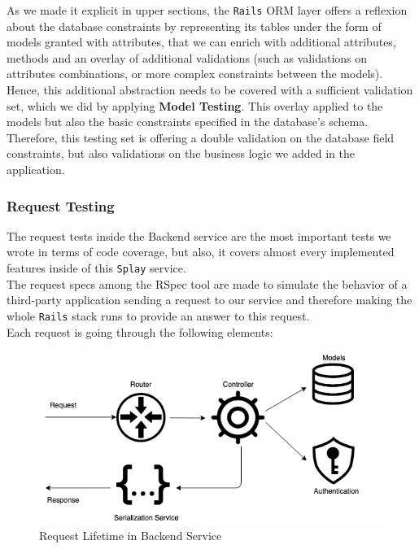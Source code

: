 \documentclass{eplmastersthesis}
\begin{document}
          As we made it explicit in upper sections, the \texttt{Rails} ORM layer offers
          a reflexion about the database constraints by representing its
          tables under the form of models granted with attributes, that we can
          enrich with additional attributes, methods and an overlay of
          additional validations (such as validations on attributes
          combinations, or more complex constraints between the models).\\

          Hence, this additional abstraction needs to be covered with a
          sufficient validation set, which we did by applying
          \textbf{Model Testing}. This overlay applied to the
          models but also the basic constraints specified in the database's
          schema.\\

          Therefore, this testing set is offering a double validation on the
          database field constraints, but also validations on the business
          logic we added in the application.

        \subsubsection{Request Testing}

          The request tests inside the Backend service are the most important
          tests we wrote in terms of code coverage, but also, it covers almost
          every implemented features inside of this \texttt{Splay} service.\\

          The request specs among the RSpec tool are made to simulate
          the behavior of a third-party application sending a request to
          our service and therefore making the whole \texttt{Rails} stack runs
          to provide an answer to this request.\\
          Each request is going through the following elements:

          \begin{figure}[H]
            \centering
            \includegraphics[scale=0.6]{figures/request_test.png}
            \caption{\label{request_test} Request Lifetime in Backend Service}
          \end{figure}
\end{document}
